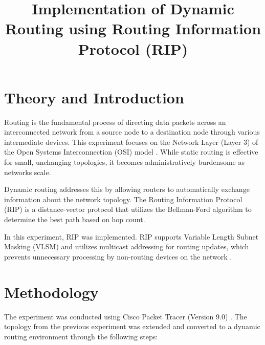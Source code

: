 \documentclass[11pt]{article}
\title{Implementation of Dynamic Routing using Routing Information Protocol (RIP)}
\author{}
\date{}
\begin{document}


\pagebreak

\tableofcontents

\pagebreak
{}
\maketitle

\section{Theory and Introduction}
Routing is the fundamental process of directing data packets across an interconnected network from a source node to a destination node through various intermediate devices. This experiment focuses on the Network Layer (Layer 3) of the Open Systems Interconnection (OSI) model \cite{tanenbaum2021}. While static routing is effective for small, unchanging topologies, it becomes administratively burdensome as networks scale.

Dynamic routing addresses this by allowing routers to automatically exchange information about the network topology. The Routing Information Protocol (RIP) is a distance-vector protocol that utilizes the Bellman-Ford algorithm to determine the best path based on hop count.

In this experiment, RIP was implemented. RIP supports Variable Length Subnet Masking (VLSM) and utilizes multicast addressing for routing updates, which prevents unnecessary processing by non-routing devices on the network \cite{stallings2013}.

\section{Methodology}
The experiment was conducted using Cisco Packet Tracer (Version 9.0) \cite{packettracer2026}. The topology from the previous experiment was extended and converted to a dynamic routing environment through the following steps:
\end{document}

